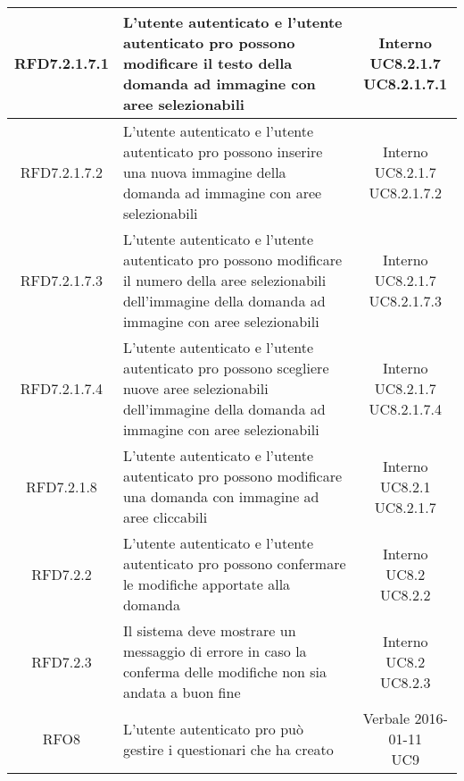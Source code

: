 \begin{longtable}{|c|>{\centering}m{7cm}|c|}
			 \hypertarget{{RFD7.2.1.7.1}}{{RFD7.2.1.7.1}} & L’utente autenticato e l'utente autenticato pro possono modificare il testo della domanda ad immagine con aree selezionabili & \makecell{Interno\\ UC8.2.1.7 \\UC8.2.1.7.1 } \\ \hline
			 \hypertarget{{RFD7.2.1.7.2}}{{RFD7.2.1.7.2}} & L’utente autenticato e l'utente autenticato pro possono inserire una nuova immagine della domanda ad immagine con aree selezionabili & \makecell{Interno\\ UC8.2.1.7 \\UC8.2.1.7.2 } \\ \hline
			 \hypertarget{{RFD7.2.1.7.3}}{{RFD7.2.1.7.3}} & L’utente autenticato e l'utente autenticato pro possono modificare il numero della aree selezionabili dell’immagine della domanda ad immagine con aree selezionabili & \makecell{Interno\\ UC8.2.1.7 \\UC8.2.1.7.3 } \\ \hline
			 \hypertarget{{RFD7.2.1.7.4}}{{RFD7.2.1.7.4}} & L’utente autenticato e l'utente autenticato pro possono scegliere nuove aree selezionabili dell’immagine della domanda ad immagine con aree selezionabili & \makecell{Interno\\ UC8.2.1.7 \\UC8.2.1.7.4 } \\ \hline
			 \hypertarget{{RFD7.2.1.8}}{{RFD7.2.1.8}} & L’utente autenticato e l’utente autenticato pro possono modificare una domanda con immagine ad aree cliccabili & \makecell{Interno\\ UC8.2.1 \\UC8.2.1.7 } \\ \hline
			 \hypertarget{{RFD7.2.2}}{{RFD7.2.2}} & L’utente autenticato e l'utente autenticato pro possono confermare le modifiche apportate alla domanda & \makecell{Interno\\ UC8.2 \\UC8.2.2 } \\ \hline
			 \hypertarget{{RFD7.2.3}}{{RFD7.2.3}} & Il sistema deve mostrare un messaggio di errore in caso la conferma delle modifiche non sia andata a buon fine & \makecell{Interno\\ UC8.2 \\UC8.2.3 } \\ \hline
			 \hypertarget{{RFO8}}{{RFO8}} & L’utente autenticato pro può gestire i questionari che ha creato & \makecell{Verbale 2016-01-11\\ UC9 } \\ \hline

\end{longtable}
